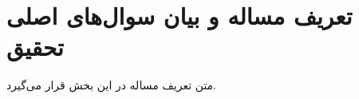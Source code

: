 \section{تعریف مساله و بیان سوال‌های اصلی تحقیق}
\label{ch1.1}

متن تعریف مساله در این بخش قرار می‌گیرد.

